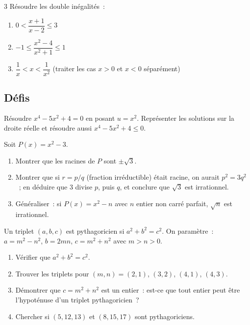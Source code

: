 \begin{probleme}{3}
R\'esoudre les double in\'egalit\'es~:
\begin{enumerate}
  \item $0 < \dfrac{x+1}{x-2} \leq 3$
  \item $-1 \leq \dfrac{x^2-4}{x^2+1} \leq 1$
  \item $\dfrac{1}{x} < x < \dfrac{1}{x^2}$
        \quad(traiter les cas $x>0$ et $x<0$ s\'epar\'ement)
\end{enumerate}
\end{probleme}

\subsection*{D\'efis}

\begin{challenge}
R\'esoudre $x^4 - 5x^2 + 4 = 0$ en posant $u = x^2$.
Repr\'esenter les solutions sur la droite r\'eelle
et r\'esoudre aussi $x^4 - 5x^2 + 4 \leq 0$.
\end{challenge}

\begin{challenge}
Soit $P(x) = x^2 - 3$.
\begin{enumerate}
  \item Montrer que les racines de $P$ sont $\pm\sqrt{3}$.
  \item Montrer que si $r = p/q$ (fraction irr\'eductible) \'etait racine,
        on aurait $p^2 = 3q^2$~; en d\'eduire que $3$ divise $p$, puis $q$,
        et conclure que $\sqrt{3}$ est irrationnel.
  \item G\'en\'eraliser~: si $P(x) = x^2 - n$ avec $n$ entier non carr\'e parfait,
        $\sqrt{n}$ est irrationnel.
\end{enumerate}
\end{challenge}

\begin{challenge}
Un triplet $(a,b,c)$ est pythagoricien si $a^2+b^2=c^2$.
On param\`etre~: $a = m^2-n^2$, $b = 2mn$, $c = m^2+n^2$ avec $m > n > 0$.
\begin{enumerate}
  \item V\'erifier que $a^2+b^2=c^2$.
  \item Trouver les triplets pour $(m,n)=(2,1)$, $(3,2)$, $(4,1)$, $(4,3)$.
  \item D\'emontrer que $c = m^2+n^2$ est un entier~: est-ce
        que tout entier peut \^etre l'hypot\'enuse d'un triplet pythagoricien~?
  \item Chercher si $(5,12,13)$ et $(8,15,17)$ sont pythagoriciens.
\end{enumerate}
\end{challenge}

